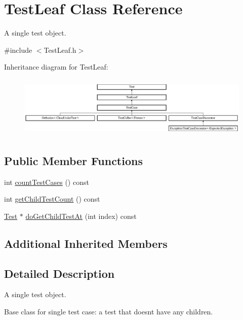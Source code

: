 \hypertarget{class_test_leaf}{}\section{Test\+Leaf Class Reference}
\label{class_test_leaf}


A single test object.  




{\ttfamily \#include $<$Test\+Leaf.\+h$>$}

Inheritance diagram for Test\+Leaf\+:\begin{figure}[H]
\begin{center}
\leavevmode
\includegraphics[height=2.962963cm]{class_test_leaf}
\end{center}
\end{figure}
\subsection*{Public Member Functions}
\begin{DoxyCompactItemize}
\item 
int \hyperlink{class_test_leaf_aecf22f6d00f9a35d89c00c4b83e34aff}{count\+Test\+Cases} () const 
\item 
int \hyperlink{class_test_leaf_a74463f8aa3dae0f727f26a184233749a}{get\+Child\+Test\+Count} () const 
\item 
\hyperlink{class_test}{Test} $\ast$ \hyperlink{class_test_leaf_ac6c850de11b23821255839205fb319d5}{do\+Get\+Child\+Test\+At} (int index) const 
\end{DoxyCompactItemize}
\subsection*{Additional Inherited Members}


\subsection{Detailed Description}
A single test object. 

Base class for single test case\+: a test that doesn\textquotesingle{}t have any children. 

